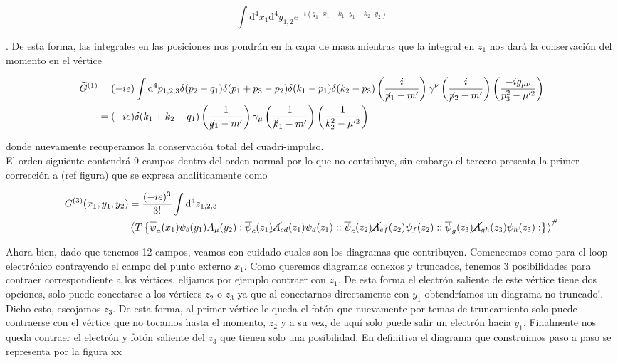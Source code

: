 \documentclass{article}
\numberwithin{equation}{section}
\begin{document}
\begin{equation}\label{expfourier}
\int\mathrm{d^4}x_1\mathrm{d^4}y_{1,2} e^{-i\left(q_1 \cdot x_1 - k_1 \cdot y_1 - k_2 \cdot y_2\right)}
\end{equation}

. De esta forma, las integrales en las posiciones nos pondrán en la capa de masa mientras que la integral en $ z_1 $ nos dará la conservación del momento en el vértice

\begin{equation}\label{key}
\begin{aligned}
\widetilde{G}^{(1)}&= (-ie)\int \mathrm{d^4}p_{1,2,3} \delta(p_2-q_1)\delta(p_1+p_3-p_2) \delta(k_1-p_1)\delta(k_2-p_3) \left(\frac{i}{\cancel{p}_1 -m'}\right) \gamma^{\nu}\left(\frac{i}{\cancel{p}_2 -m'}\right) \left(\frac{-ig_{\mu\nu}}{p^2_3-\mu'^2}\right)\\
&=(-ie) \delta(k_1 +k_2 -q_1)  \left(\frac{1}{\cancel{q}_1 -m'}\right) \gamma_{\mu}\left(\frac{1}{\cancel{k}_1 -m'}\right) \left(\frac{1}{k_2^2-\mu'^2}\right)
\end{aligned}
\end{equation}

donde nuevamente recuperamos la conservación total del cuadri-impulso.\\

El orden siguiente contendrá 9 campos dentro del orden normal por lo que no contribuye, sin embargo el tercero presenta la primer corrección a (ref figura) que se expresa analiticamente como

\begin{equation}\label{key}
\begin{aligned}
G^{(3)}(x_1,y_1,y_2)&=\frac{(-ie)^3}{3!}\int \mathrm{d^4}z_{1,2,3}\\
&\left\langle T\left\{ \overline{\psi}_a(x_1)\psi_b(y_1)A_{\mu}(y_2) :\overline{\psi}_c(z_{1})\cancel{A}_{cd}(z_{1})\psi_d(z_{1})::\overline{\psi}_e(z_2)\cancel{A}_{ef}(z_2)\psi_f(z_2)::\overline{\psi}_g(z_3)\cancel{A}_{gh}(z_3)\psi_h(z_3):\right\} \right\rangle ^{\#}
\end{aligned}
\end{equation}

Ahora bien, dado que tenemos 12 campos, veamos con cuidado cuales son los diagramas que contribuyen. Comencemos como para el loop electrónico contrayendo el campo del punto externo $ x_1 $. Como queremos diagramas conexos y truncados, tenemos 3 posibilidades para contraer correspondiente a los vértices, elijamos por ejemplo contraer con $ z_1 $. De esta forma el electrón saliente de este vértice tiene dos opciones, solo puede conectarse a los vértices $ z_2 $ o $ z_3 $ ya que al conectarnos directamente con $ y_1 $ obtendríamos un diagrama no truncado!. Dicho esto, escojamos $ z_3 $. De esta forma, al primer vértice le queda el fotón que nuevamente por temas de truncamiento solo puede contraerse con el vértice que no tocamos hasta el momento, $ z_2 $ y a su vez, de aquí solo puede salir un electrón hacia $ y_1 $. Finalmente nos queda contraer el electrón y fotón saliente del $ z_3 $ que tienen solo una posibilidad. En definitiva el diagrama que construimos paso a paso se representa por la figura xx\\
\end{document}
